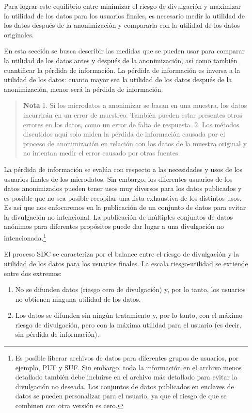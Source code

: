 \documentclass[]{book}
\providecommand{\tightlist}{%
  \setlength{\itemsep}{0pt}\setlength{\parskip}{0pt}}
\theoremstyle{definition}
\theoremstyle{definition}
\theoremstyle{definition}
\theoremstyle{definition}
\theoremstyle{remark}
\begin{document}
Para lograr este equilibrio entre minimizar el riesgo de divulgación y maximizar la utilidad de los datos para los usuarios finales, es necesario medir la utilidad de los datos después de la anonimización y compararla con la utilidad de los datos originales.

En esta sección se busca describir las medidas que se pueden usar para comparar la utilidad de los datos antes y después de la anonimización, así como también cuantificar la pérdida de información. La pérdida de información es inversa a la utilidad de los datos: cuanto mayor sea la utilidad de los datos después de la anonimización, menor será la pérdida de información.

\begin{quote}
\textbf{Nota}
1. Si los microdatos a anonimizar se basan en una muestra, los datos incurrirán en un error de muestreo. También pueden estar presentes otros errores en los datos, como un error de falta de respuesta.
2. Los métodos discutidos aquí solo miden la pérdida de información causada por el proceso de anonimización en relación con los datos de la muestra original y no intentan medir el error causado por otras fuentes.
\end{quote}

La pérdida de información se evalúa con respecto a las necesidades y usos de los usuarios finales de los microdatos. Sin embargo, los diferentes usuarios de los datos anonimizados pueden tener usos muy diversos para los datos publicados y es posible que no sea posible recopilar una lista exhaustiva de los distintos usos. Es así que nos enfocaremos en la publicación de un conjunto de datos para evitar la divulgación no intencional. La publicación de múltiples conjuntos de datos anónimos para diferentes propósitos puede dar lugar a una divulgación no intencionada.\footnote{Es posible liberar archivos de datos para diferentes grupos de usuarios, por ejemplo, PUF y SUF. Sin embargo, toda la información en el archivo menos detallado también debe incluirse en el archivo más detallado para evitar la divulgación no deseada. Los conjuntos de datos publicados en enclaves de datos se pueden personalizar para el usuario, ya que el riesgo de que se combinen con otra versión es cero.}

El proceso SDC se caracteriza por el balance entre el riesgo de divulgación y la utilidad de los datos para los usuarios finales. La escala riesgo-utilidad se extiende entre dos extremos:

\begin{enumerate}
\def\labelenumi{\arabic{enumi}.}
\tightlist
\item
  No se difunden datos (riesgo cero de divulgación) y, por lo tanto, los usuarios no obtienen ninguna utilidad de los datos.
\item
  Los datos se difunden sin ningún tratamiento y, por lo tanto, con el máximo riesgo de divulgación, pero con la máxima utilidad para el usuario (es decir, sin pérdida de información).
\end{enumerate}
\end{document}
